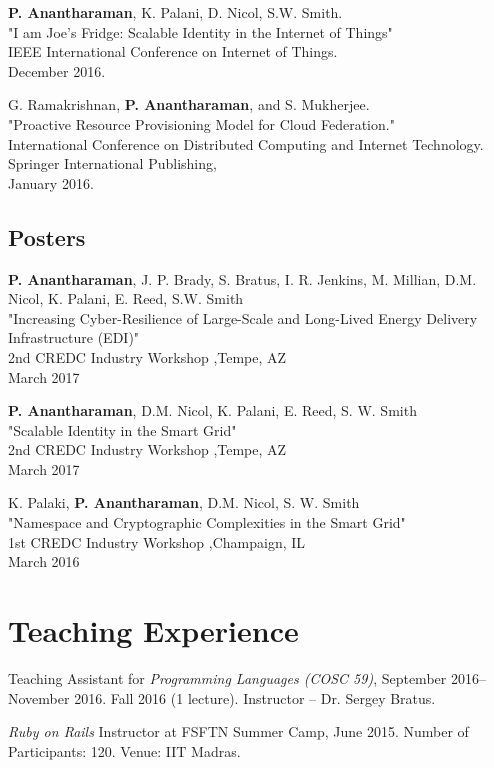 \documentclass[letterpaper,10pt]{article}
\renewenvironment{itemize}{
  \begin{list}{}{
    \setlength{\leftmargin}{1.5em}
  }
}{
  \end{list}
}
\begin{document}
\begin{etaremune}
\setlength\itemsep{0ex}
\item {\bf P. Anantharaman}, K. Palani, D. Nicol, S.W. Smith.\\
    "I am Joe's Fridge: Scalable Identity in the Internet of Things"\\
    IEEE International Conference on Internet of Things.\\
    December 2016.
\item G. Ramakrishnan, {\bf P. Anantharaman}, and S. Mukherjee.\\
    "Proactive Resource Provisioning Model for Cloud Federation."\\
    International Conference on Distributed Computing and Internet Technology. Springer International Publishing,\\
    January 2016.
\end{etaremune}

\subsection*{Posters}

\begin{etaremune}
\setlength\itemsep{0ex}
\item \textbf{P. Anantharaman}, J. P. Brady, S. Bratus, I. R. Jenkins, M. Millian, D.M. Nicol, K. Palani, E. Reed, S.W. Smith\\
    "Increasing Cyber-Resilience of Large-Scale and Long-Lived Energy Delivery Infrastructure (EDI)"\\
    2nd CREDC Industry Workshop ,Tempe, AZ\\
    March 2017


\item \textbf{P. Anantharaman}, D.M. Nicol, K. Palani, E. Reed, S. W. Smith\\
    "Scalable Identity in the Smart Grid"\\
    2nd CREDC Industry Workshop ,Tempe, AZ\\
    March 2017
\item  K. Palaki, {\bf P. Anantharaman}, D.M. Nicol, S. W. Smith\\
    "Namespace and Cryptographic Complexities in the Smart Grid"\\
    1st CREDC Industry Workshop ,Champaign, IL\\
    March 2016
\end{etaremune}

\section*{Teaching Experience}
\begin{itemize}
\setlength\itemsep{0ex}
\item Teaching Assistant for \textit{Programming Languages (COSC 59)}, September 2016-- November 2016.
		\subitem Fall 2016 (1 lecture). Instructor -- Dr. Sergey Bratus.
\item \textit{Ruby on Rails} Instructor at FSFTN Summer Camp, June 2015.
    \subitem Number of Participants: 120.
    \subitem Venue: IIT Madras.
\end{itemize}
\end{document}
